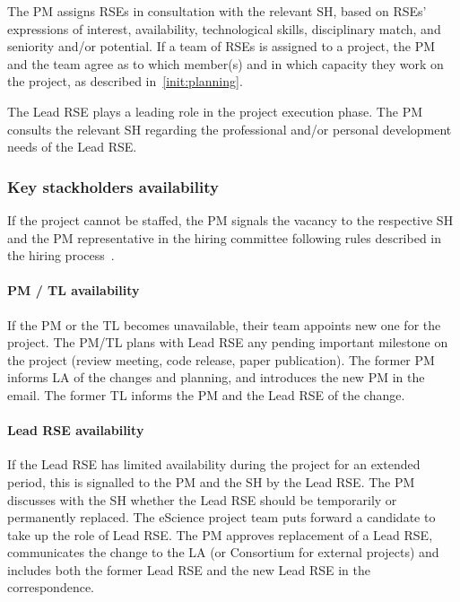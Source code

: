 The PM assigns RSEs in consultation with the
relevant SH, based on RSEs' expressions of interest, availability, technological skills, 
disciplinary match, and seniority and/or potential. 
%
If a team of RSEs is assigned to a project, the PM and the team agree as to which member(s) and in
which capacity they work on the project, as described in~\ref{init:planning}. %

The Lead RSE plays a leading role in the project execution phase. The PM consults the relevant SH regarding the
professional and/or personal development needs of the Lead RSE.


\subsubsection{Key stackholders availability}

If %
the project cannot be staffed, the PM signals the vacancy to the respective
SH and the PM representative in the hiring committee following rules described in the hiring process~\cite{intranet}.

\paragraph{PM / TL availability} If the PM or the TL becomes unavailable, their team appoints new one for the project.
The PM/TL plans with Lead RSE any pending important milestone on the project (review meeting, code release, paper publication).
The former PM informs LA of the changes and planning, and introduces the new PM in the email. The former TL informs the PM and the Lead RSE of the change.

\paragraph{Lead RSE availability}
If the Lead RSE has limited availability during the project for an extended period, this is signalled to the PM and the
SH by the Lead RSE. The PM discusses with the SH whether the Lead RSE should be temporarily or permanently replaced.
The eScience project team puts forward a candidate to take up the role of Lead RSE. The PM approves replacement of a Lead RSE, 
communicates the change to the LA (or Consortium for external projects) and includes both the former Lead RSE and the
new Lead RSE in the correspondence.

